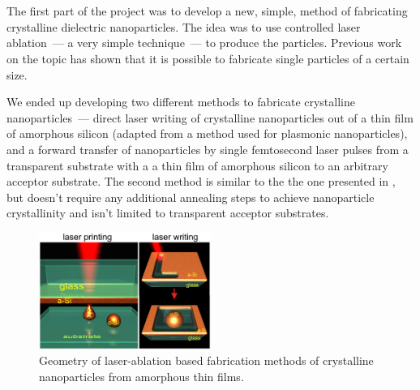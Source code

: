 \section{}
\label{sec:Ablation}
        The first part of the project was to develop a new, simple, method of fabricating crystalline dielectric
    nanoparticles. The idea was to use controlled laser ablation~--- a very simple technique~--- to produce the particles.
    Previous work on the topic\cite{kuznetsov2012magnetic, zywietz2014laser} has shown that it is possible to fabricate single particles
    of a certain size.

        We ended up developing two different methods to fabricate crystalline nanoparticles~--- direct laser writing of crystalline
    nanoparticles out of a thin film of amorphous silicon (adapted from a method used for plasmonic nanoparticles\cite{makarov2016controllable,
    dmitriev2016direct}), and a forward transfer of nanoparticles by single femtosecond laser pulses
    from a transparent substrate with a a thin film of amorphous silicon to an arbitrary acceptor substrate. The second method is
    similar to the the one presented in \cite{zywietz2014laser}, but doesn't require any additional annealing steps to achieve
    nanoparticle crystallinity and isn't limited to transparent acceptor substrates.

    \begin{figure}[h!]
            \begin{center}
                \includegraphics[width=0.5\textwidth]{figs/methods/LaserPrinting.eps}
            \end{center}
            \caption{Geometry of laser-ablation based fabrication methods of crystalline nanoparticles from amorphous
                        thin films.}
            \label{fig:LaserPrinting}
    \end{figure}

    \subsection{}

